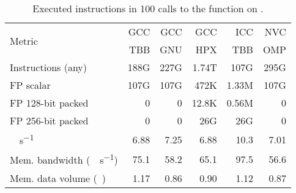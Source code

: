 \begin{table}[t]
	\centering
	\caption{Executed instructions in 100 calls to the function \groupreduce on \machhydralong.}
	\label{tab:reduce-hw-counters}
	\begin{adjustbox}{max width=\linewidth}
	\begin{tabular}{lrrrrr}
		\toprule
		\multirow{2}{*}{Metric}                       & GCC  & GCC  & GCC   & ICC   & NVC  \\
		                                              & TBB  & GNU  & HPX   & TBB   & OMP  \\
		\midrule
		Instructions (any)                            & 188G & 227G & 1.74T & 107G  & 295G \\
		FP scalar                                     & 107G & 107G & 472K  & 1.33M & 107G \\
		FP 128-bit packed                             & 0    & 0    & 12.8K & 0.56M & 0    \\
		FP 256-bit packed                             & 0    & 0    & 26G   & 26G   & 0    \\
		\unit{\giga\FLOP\per\second}                  & 6.88 & 7.25 & 6.88  & 10.3  & 7.01 \\
		Mem. bandwidth (\unit{\gibi\byte\per\second}) & 75.1 & 58.2 & 65.1  & 97.5  & 56.6 \\
		Mem. data volume (\unit{\gibi\byte})          & 1.17 & 0.86 & 0.90  & 1.12  & 0.87 \\
		\bottomrule
	\end{tabular}
	\end{adjustbox}
\end{table}



